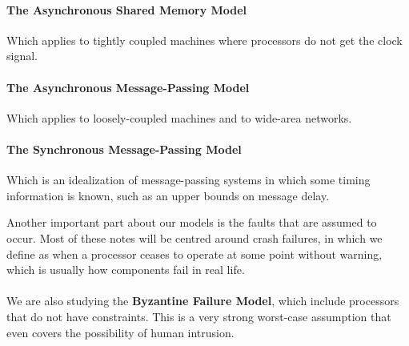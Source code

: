 \documentclass[12pt]{article}
\begin{document}
\paragraph{The Asynchronous Shared Memory Model} Which applies to tightly coupled machines where processors do not get the clock signal.

\paragraph{The Asynchronous Message-Passing Model} Which applies to loosely-coupled machines and to wide-area networks.

\paragraph{The Synchronous Message-Passing Model} Which is an idealization of message-passing systems in which some timing information is known, such as an upper bounds on message delay.

Another important part about our models is the faults that are assumed to occur. Most of these notes will be centred around crash failures, in which we define as when a processor ceases to operate at some point without warning, which is usually how components fail in real life.\\
\\
We are also studying the \textbf{Byzantine Failure Model}, which include processors that do not have constraints. This is a very strong worst-case assumption that even covers the possibility of human intrusion.
 
\end{document}
